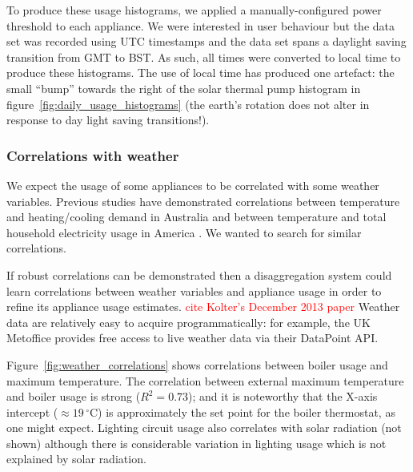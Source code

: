 \documentclass{sig-alternate}
\newcommand{\redcolor}[1]{\textcolor{red}{#1}}
\begin{document}
To produce these usage histograms, we applied a manually-configured
power threshold to each appliance.  We were interested in user
behaviour but the data set was recorded using UTC timestamps and the
data set spans a daylight saving transition from GMT to BST.  As such,
all times were converted to local time to produce these histograms.
The use of local time has produced one artefact: the small ``bump''
towards the right of the solar thermal pump histogram in
figure~\ref{fig:daily_usage_histograms} (the earth's rotation does not
alter in response to day light saving transitions!).

\subsubsection{Correlations with weather}

\noindent
We expect the usage of some appliances to be correlated with some
weather variables.  Previous studies have demonstrated correlations
between temperature and heating/cooling demand in
Australia\cite{RicharddeDear2002} and between temperature and total
household electricity usage in America \cite{Kavousian2013a}.  We
wanted to search for similar correlations.

If robust correlations can be demonstrated then a disaggregation
system could learn correlations between weather variables and
appliance usage in order to refine its appliance usage estimates. \redcolor{cite Kolter's December 2013 paper}
Weather data are relatively easy to acquire programmatically: for
example, the UK Metoffice provides free access to live weather data
via their DataPoint API.

Figure~\ref{fig:weather_correlations} shows correlations between
boiler usage and maximum temperature.  The correlation between
external maximum temperature and boiler usage is strong ($R^2=0.73$); and it is
noteworthy that the X-axis intercept ($\approx19\,^{\circ}\mathrm{C}$)
is approximately the set point for the boiler thermostat, as one might
expect.  Lighting circuit usage also correlates with solar radiation
(not shown) although there is considerable variation in lighting usage
which is not explained by solar radiation.
\end{document}
